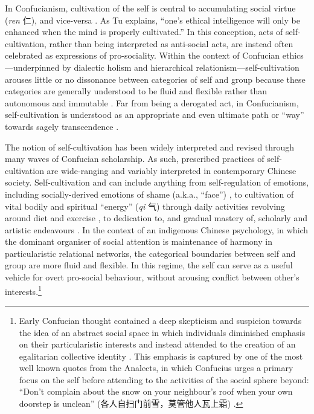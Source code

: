 \begin{CJK}{UTF8}{gbsn}
In Confucianism, cultivation of the self is central to accumulating social virtue (\textit{ren} 仁), and vice-versa \citep{Hwang2012}. As Tu explains, ``one's ethical intelligence will only be enhanced when the mind is properly cultivated.''  In this conception, acts of self-cultivation, rather than being interpreted as anti-social acts, are instead often celebrated as expressions of pro-sociality.  Within the context of Confucian ethics---underpinned by dialectic holism and hierarchical relationism---self-cultivation arouses little or no dissonance between categories of self and group because these categories are generally understood to be fluid and flexible rather than autonomous and immutable \citep{Nisbett2003}.  Far from being a derogated act, in Confucianism, self-cultivation is understood as an appropriate and even ultimate path or ``way'' towards sagely transcendence \citep[106]{Hwang2012}.

The notion of self-cultivation has been widely interpreted and revised through many waves of Confucian scholarship. As such, prescribed practices of self-cultivation are wide-ranging and variably interpreted in contemporary Chinese society.  Self-cultivation and can include anything from self-regulation of emotions, including socially-derived emotions of shame (a.k.a., ``face'') \citep{Matsumoto2012}, to cultivation of vital bodily and spiritual ``energy'' (\textit{qi} 气) through daily activities revolving around diet and exercise \citep{Farquhar2012}, to dedication to, and gradual mastery of, scholarly and artistic endeavours \citep{Slingerland2000}.
In the context of an indigenous Chinese psychology, in which the dominant organiser of social attention is maintenance of harmony in particularistic relational networks, the categorical boundaries between self and group are more fluid and flexible.  In this regime, the self can serve as a useful vehicle for overt pro-social behaviour, without arousing conflict between other's interests.\footnote{Early Confucian thought contained a deep skepticism and suspicion towards the idea of an abstract social space in which individuals diminished emphasis on their particularistic interests and instead attended to the creation of an egalitarian collective identity \citep{Bollas2013}.  This emphasis is captured by one of the most well known quotes from the Analects, in which Confucius urges a primary focus on the self before attending to the activities of the social sphere beyond: ``Don’t complain about the snow on your neighbour’s roof when your own doorstep is unclean''
(各人自扫门前雪，莫管他人瓦上霜) \citep{Leys1997}.}


\end{CJK}
